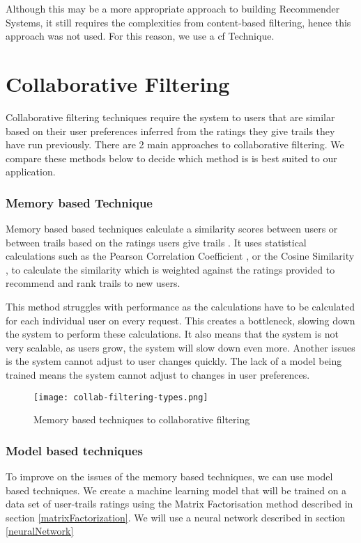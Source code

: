 Although this may be a more appropriate approach to building Recommender Systems, it still requires the complexities from content-based filtering, hence this approach was not used. For this reason, we use a \acrlong{cf} Technique.

\section{Collaborative Filtering}
Collaborative filtering techniques require the system to users that are similar based on their user preferences inferred from the ratings they give trails they have run previously. There are 2 main approaches to collaborative filtering. We compare these methods below to decide which method is is best suited to our application.

\subsubsection{Memory based Technique}
Memory based based techniques calculate a similarity scores between users or between trails based on the ratings users give trails  \cite{wang2006unifying}. It uses statistical calculations such as the Pearson Correlation Coefficient \cite{benesty2009pearson}, or the Cosine Similarity \cite{michie1994machine}, to calculate the similarity which is weighted against the ratings provided to recommend and rank trails to new users.

This method struggles with performance as the calculations have to be calculated for each individual user on every request. This creates a bottleneck, slowing down the system to perform these calculations. It also means that the system is not very scalable, as users grow, the system will slow down even more. Another issues is the system cannot adjust to user changes quickly. The lack of a model being trained means the system cannot adjust to changes in user preferences.

\begin{figure}[htb!]
    \centering
    \texttt{[image: collab-filtering-types.png]}
    \caption{Memory based techniques to collaborative filtering \cite{collabFilteringTypes}}
    \label{fig:collabFilteringTypes}
\end{figure}

\subsubsection{Model based techniques}
To improve on the issues of the memory based techniques, we can use model based techniques. We create a machine learning model that will be trained on a data set of user-trails ratings using the Matrix Factorisation method described in section \ref{matrixFactorization}. We will use a neural network described in section \ref{neuralNetwork}

